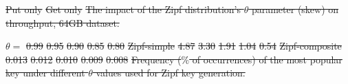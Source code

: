\documentclass[sigplan,10pt]{acmart}
\providecommand{\DIFdel}[1]{{\protect\color{red}\sout{#1}}}                      %
\providecommand{\DIFdelFL}[1]{\DIFdel{#1}} %
\begin{document}
{%
\DIFdelFL{Put only}}
{%
\DIFdelFL{Get only}}
{%
\DIFdelFL{The impact of the Zipf distribution's $\theta$ parameter (skew) on throughput, 64GB dataset.}%
}

\DIFdelFL{$\theta=$	}%
\DIFdelFL{0.99 }%
\DIFdelFL{0.95 }%
\DIFdelFL{0.90 }%
\DIFdelFL{0.85 }%
\DIFdelFL{0.80 }%
\DIFdelFL{Zipf-simple }%
\DIFdelFL{4.87 }%
\DIFdelFL{3.30 }%
\DIFdelFL{1.91 }%
\DIFdelFL{1.04 }%
\DIFdelFL{0.54 }%
	\DIFdelFL{Zipf-composite }%
\DIFdelFL{0.013 }%
\DIFdelFL{0.012 }%
\DIFdelFL{0.010 }%
\DIFdelFL{0.009 }%
\DIFdelFL{0.008 }%
{%
\DIFdelFL{Frequency ($\%$ of occurrences) of the most popular key under different $\theta$ values used for Zipf key generation.}}
\end{document}
